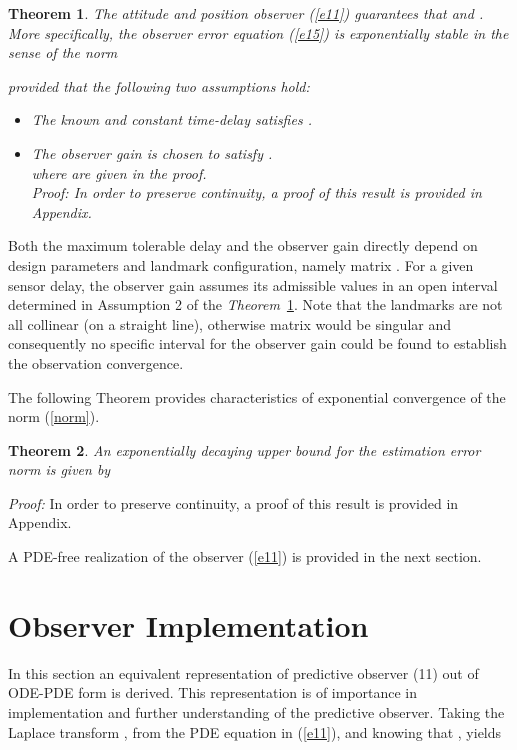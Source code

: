 \documentclass[12pt,draftcls,onecolumn]{IEEEtran}
\newtheorem{theo}{Theorem}
\newcommand{\carrew} {\hfill }
\begin{document}
\begin{theo} \label{th1} The attitude and position observer (\ref{e11}) guarantees that  and . More specifically, the observer error equation (\ref{e15}) is exponentially stable in the sense of the norm

provided that the following two assumptions hold:
\begin{itemize}
\item[1)] The known and constant time-delay satisfies .
\item[2)] The observer gain is chosen to satisfy .\\
where  are given in the proof.\\
{\it Proof:} In order to preserve continuity, a proof of this result is provided in Appendix. 
\end{itemize} \carrew
\end{theo}

Both the maximum tolerable delay and the observer gain directly depend on design parameters and landmark configuration, namely matrix . For a given sensor delay, the observer gain assumes its admissible values in an open interval determined in Assumption 2 of the \textit{Theorem}~\ref{th1}. Note that the landmarks are not all collinear (on a straight line), otherwise matrix  would be singular and consequently no specific interval for the observer gain  could be found to establish the observation convergence.


The following Theorem provides characteristics of exponential convergence of the norm (\ref{norm}).
\begin{theo} \label{th2}  An exponentially decaying upper bound for the estimation error norm is given by
 \carrew
\end{theo}
{\it Proof:} In order to preserve continuity, a proof of this result is provided in Appendix.

A PDE-free realization of the observer (\ref{e11}) is provided in the next section.

\section{Observer Implementation}

In this section an equivalent representation of predictive observer (11) out of ODE-PDE form is derived. This representation is of importance in implementation and further understanding of the predictive observer.
Taking the Laplace transform , from the PDE equation in (\ref{e11}), and knowing that , yields
\end{document}
